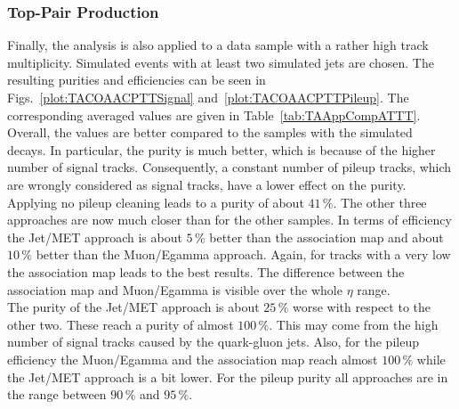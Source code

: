 \subsubsection{Top-Pair Production \label{sec:TASEFRDACPTT}}
Finally, the analysis is also applied to a data sample with a rather high track multiplicity. Simulated \ttbar events with at least two simulated jets are chosen. The resulting purities and efficiencies can be seen in Figs.~\ref{plot:TACOAACPTTSignal} and~\ref{plot:TACOAACPTTPileup}. The corresponding averaged values are given in Table~\ref{tab:TAAppCompATTT}. Overall, the values are better compared to the samples with the simulated \Zz decays. In particular, the purity is much better, which is because of the higher number of signal tracks. Consequently, a constant number of pileup tracks, which are wrongly considered as signal tracks, have a lower effect on the purity. Applying no pileup cleaning leads to a purity of about $41\,\%$. The other three approaches are now much closer than for the other samples. In terms of efficiency the Jet/MET approach is about $5\,\%$ better than the association map and about $10\,\%$ better than the Muon/Egamma approach. Again, for tracks with a very low \pt the association map leads to the best results. The difference between the association map and Muon/Egamma is visible over the whole $\eta$ range. \\
The purity of the Jet/MET approach is about $25\,\%$ worse with respect to the other two. These reach a purity of almost $100\,\%$. This may come from the high number of signal tracks caused by the quark-gluon jets. Also, for the pileup efficiency the Muon/Egamma and the association map reach almost $100\,\%$ while the Jet/MET approach is a bit lower. For the pileup purity all approaches are in the range between $90\,\%$ and $95\,\%$.

